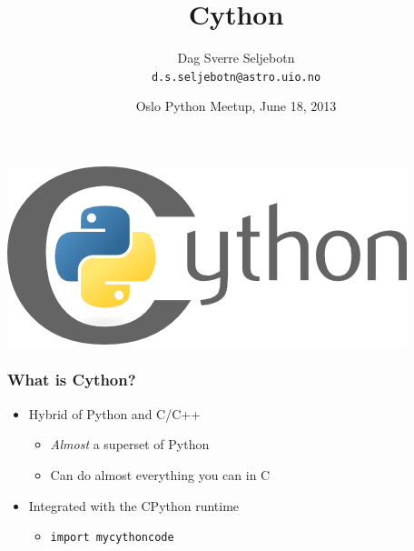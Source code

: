 \documentclass{beamer}
\title[Cython]{Cython}
\author[Seljebotn]{Dag Sverre Seljebotn \\ \texttt{d.s.seljebotn@astro.uio.no}}
\date[Oslo Python, June 18, 2013]{Oslo Python Meetup, June 18, 2013}
\institute[ITA, Uni. of Oslo]{Institute of Theoretical Astrophysics, University of Oslo}
\begin{document}
  \frame
  {
    \titlepage
    \begin{center}
    \includegraphics[scale=0.4]{cython-logo.png}
    \end{center}
  }


\begin{frame}
\frametitle{What is Cython?}

\begin{itemize} 
\item<+-> Hybrid of Python and C/C++
  \begin{itemize}
  \item {\em Almost} a superset of Python
  \item Can do almost everything you can in C
  \end{itemize}
\item<+-> Integrated with the CPython runtime
   \begin{itemize}
   \item {\tt import mycythoncode}
   \end{itemize}
\end{itemize}

\end{frame}


\end{document}
